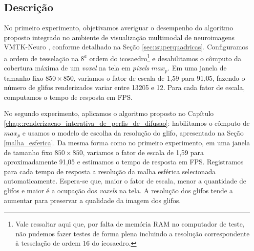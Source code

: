 \subsection{Descrição}




No primeiro experimento, objetivamos averiguar o desempenho do algoritmo proposto integrado no ambiente de visualização multimodal de neuroimagens VMTK-Neuro \cite{VMTKNeuro}, conforme detalhado na Seção \ref{sec::superquadricas}. Configuramos a ordem de tesselação na $8^a$ ordem do icosaedro\footnote{Vale ressaltar aqui que, por falta de memória RAM no computador de teste, não pudemos fazer testes de forma plena incluindo a resolução correspondente à tesselação de ordem 16 do icosaedro.} e desabilitamos o cômputo da cobertura máxima de um \textit{voxel} na tela em \textit{pixels} $max_p$. Em uma janela de tamanho fixo $850 \times 850$, variamos o fator de escala de 1,59 para 91,05, fazendo o número de glifos renderizados variar entre 13205 e 12. Para cada fator de escala, computamos o tempo de resposta em FPS.

No segundo experimento, aplicamos o algoritmo proposto no Capítulo \ref{chap::renderizacao_interativa_de_perfis_de_difusao}: habilitamos o cômputo de $max_p$ e usamos o modelo de escolha da resolução do glifo, apresentado na Seção \ref{malha_esferica}. Da mesma forma como no primeiro experimento, em uma janela de tamanho fixo $850 \times 850$, variamos o fator de escala de 1,59 para aproximadamente 91,05 e estimamos o tempo de resposta em FPS. Registramos para cada tempo de resposta a resolução da malha esférica selecionada automaticamente. Espera-se que, maior o fator de escala, menor a quantidade de glifos e maior é a ocupação dos \textit{voxels} na tela. A resolução dos glifos tende a aumentar para preservar a qualidade da imagem dos glifos.

